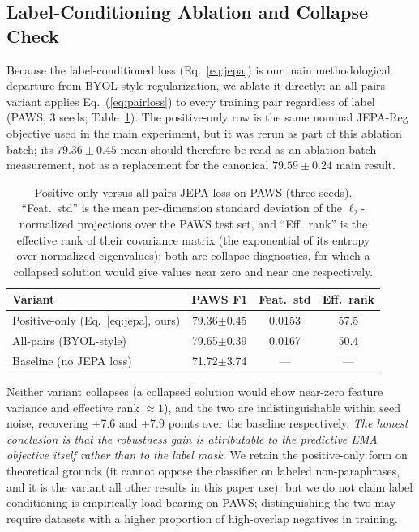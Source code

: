 \documentclass[sigconf]{acmart}
\begin{document}
\subsection{Label-Conditioning Ablation and Collapse Check}
\label{sec:maskablation}
Because the label-conditioned loss (Eq.~\ref{eq:jepa}) is our main methodological departure from BYOL-style regularization, we ablate it directly: an all-pairs variant applies Eq.~(\ref{eq:pairloss}) to every training pair regardless of label (PAWS, 3 seeds; Table~\ref{tab:mask}). The positive-only row is the same nominal JEPA-Reg objective used in the main experiment, but it was rerun as part of this ablation batch; its $79.36\pm0.45$ mean should therefore be read as an ablation-batch measurement, not as a replacement for the canonical $79.59\pm0.24$ main result.

\begin{table}[!htbp]
\caption{Positive-only versus all-pairs JEPA loss on PAWS (three seeds). ``Feat.\ std'' is the mean per-dimension standard deviation of the $\ell_2$-normalized projections over the PAWS test set, and ``Eff.\ rank'' is the effective rank of their covariance matrix (the exponential of its entropy over normalized eigenvalues); both are collapse diagnostics, for which a collapsed solution would give values near zero and near one respectively.}
\label{tab:mask}
\begin{tabular}{lccc}
\toprule
Variant & PAWS F1 & Feat.\ std & Eff.\ rank \\
\midrule
Positive-only (Eq.~\ref{eq:jepa}, ours) & 79.36$\pm$0.45 & 0.0153 & 57.5 \\
All-pairs (BYOL-style) & 79.65$\pm$0.39 & 0.0167 & 50.4 \\
Baseline (no JEPA loss) & 71.72$\pm$3.74 & --- & --- \\
\bottomrule
\end{tabular}
\end{table}

Neither variant collapses (a collapsed solution would show near-zero feature variance and effective rank $\approx 1$), and the two are indistinguishable within seed noise, recovering +7.6 and +7.9 points over the baseline respectively. \emph{The honest conclusion is that the robustness gain is attributable to the predictive EMA objective itself rather than to the label mask.} We retain the positive-only form on theoretical grounds (it cannot oppose the classifier on labeled non-paraphrases, and it is the variant all other results in this paper use), but we do not claim label conditioning is empirically load-bearing on PAWS; distinguishing the two may require datasets with a higher proportion of high-overlap negatives in training.
\end{document}
